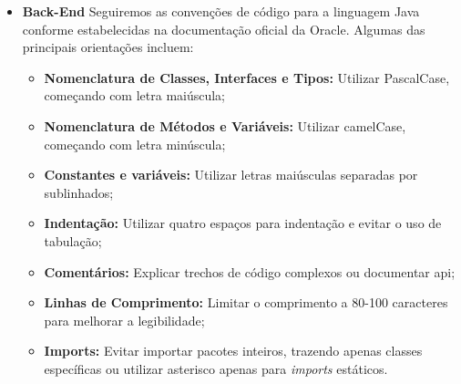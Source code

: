 \begin{itemize}
    \item \textbf{Back-End}
     Seguiremos as convenções de código  para a linguagem Java conforme estabelecidas na documentação oficial da Oracle. Algumas das principais orientações incluem:
     \begin{itemize}
        \item \textbf{Nomenclatura de Classes, Interfaces e Tipos:}
        Utilizar PascalCase, começando com letra maiúscula;
        \item \textbf{Nomenclatura de Métodos e Variáveis:}
        Utilizar camelCase, começando com letra minúscula;
        \item \textbf{Constantes e variáveis:}
        Utilizar letras maiúsculas separadas por sublinhados;
        \item \textbf{Indentação:}
        Utilizar quatro espaços para indentação e evitar o uso de tabulação;
        \item \textbf{Comentários:}
        Explicar trechos de código complexos ou documentar \ac{api};
        \item \textbf{Linhas de Comprimento:}
         Limitar o comprimento a 80-100 caracteres para melhorar a legibilidade;
        \item \textbf{Imports:}
        Evitar importar pacotes inteiros, trazendo apenas classes específicas ou utilizar asterisco apenas para \textit{imports} estáticos.
     \end{itemize}
\end{itemize}
